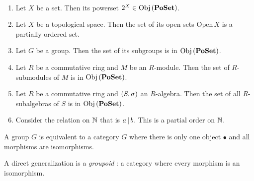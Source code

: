 \begin{eg}~
  \begin{enumerate}
    \item Let $X$ be a set. Then its powerset $2^X \in \mathrm{Obj}\left(\mathbf{PoSet}\right)$. 
    \item Let $X$ be a topological space. 
    Then the set of its open sets $\mathrm{Open}\,X$ is a partially ordered set.
    \item Let $G$ be a group. 
    Then the set of its subgroups is in $\mathrm{Obj}\left(\mathbf{PoSet}\right)$.
    \item Let $R$ be a commutative ring and $M$ be an $R$-module.
    Then the set of $R$-submodules of $M$ is in $\mathrm{Obj}\left(\mathbf{PoSet}\right)$.
    \item Let $R$ be a commutative ring and $(S,\sigma)$ an $R$-algebra. 
    Then the set of all $R$-subalgebras of $S$ is in $\mathrm{Obj}\left(\mathbf{PoSet}\right)$. 
    \item Consider the relation on $\mathbb{N}$ that is $a \,|\, b$. 
    This is a partial order on $\mathbb{N}$. 
  \end{enumerate}
\end{eg}

\begin{eg}
  
  A group $G$ is equivalent to 
  a category $G$ where there is only one object $\bullet$ and 
  all morphisms are isomorphisms. 

  A direct generalization is a \emph{groupoid} : 
  a category where every morphism is an isomorphism. 
\end{eg}
